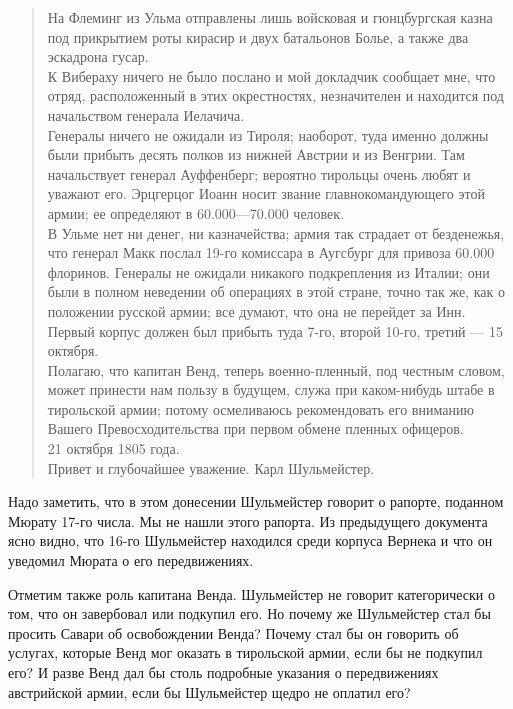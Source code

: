 \documentclass[
  oneside,
  12pt,
  titlepage]{book}
\begin{document}
\begin{quote}
На Флеминг из Ульма отправлены лишь войсковая и гюнцбургская казна под прикрытием роты кирасир и двух батальонов Болье, а также два эскадрона гусар.\\
К Вибераху ничего не было послано и мой докладчик сообщает мне, что отряд, расположенный в этих окрестностях, незначителен и находится под начальством генерала Иелачича.\\
Генералы ничего не ожидали из Тироля; наоборот, туда именно должны были прибыть десять полков из нижней Австрии и из Венгрии. Там начальствует генерал Ауффенберг; вероятно тирольцы очень любят и уважают его. Эрцгерцог Иоанн носит звание главнокомандующего этой армии; ее определяют в 60.000---70.000 человек.\\
В Ульме нет ни денег, ни казначейства; армия так страдает от безденежья, что генерал Макк послал 19-го комиссара в Аугсбург для привоза 60.000 флоринов. Генералы не ожидали никакого подкрепления из Италии; они были в полном неведении об операциях в этой стране, точно так же, как о положении русской армии; все думают, что она не перейдет за Инн. Первый корпус должен был прибыть туда 7-го, второй 10-го, третий --- 15 октября.\\
Полагаю, что капитан Венд, теперь военно-пленный, под честным словом, может принести нам пользу в будущем, служа при каком-нибудь штабе в тирольской армии; потому осмеливаюсь рекомендовать его вниманию Вашего Превосходительства при первом обмене пленных офицеров.\\
21 октября 1805 года.\\
Привет и глубочайшее уважение. Карл Шульмейстер.
\end{quote}

Надо заметить, что в этом донесении Шульмейстер говорит о рапорте, поданном Мюрату 17-го числа. Мы не нашли этого рапорта. Из предыдущего документа ясно видно, что 16-го Шульмейстер находился среди корпуса Вернека и что он уведомил Мюрата о его передвижениях.

Отметим также роль капитана Венда. Шульмейстер не говорит категорически о том, что он завербовал или подкупил его. Но почему же Шульмейстер стал бы просить Савари об освобождении Венда? Почему стал бы он говорить об услугах, которые Венд мог оказать в тирольской армии, если бы не подкупил его? И разве Венд дал бы столь подробные указания о передвижениях австрийской армии, если бы Шульмейстер щедро не оплатил его?
\end{document}
